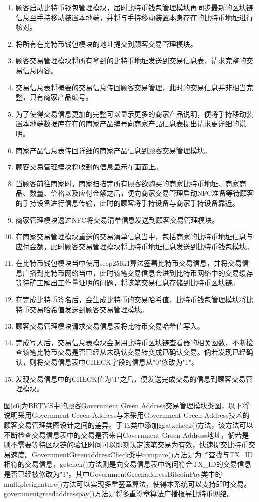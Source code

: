 	\begin{enumerate}
		\item 顾客启动比特币钱包管理模块，届时比特币钱包管理模块再同步最新的区块链信息至手持移动装置本地端，并将与手持移动装置本身存在的比特币地址进行核对。
		\item 将所有在比特币钱包模块的地址提交到顾客交易管理模块。
		\item 顾客交易管理模块将所有拿到的比特币地址发送到交易信息表，请求完整的交易信息内容。
		\item 交易信息表将概要的交易信息传回顾客交易管理，此时的交易信息并非相当完整，只有商家产品编号。
		\item 为了使得交易信息更加的完整可以显示更多的商家产品说明，便将手持移动装置本地端数据库存在的商家产品编号向商家产品信息表提出请求更详细的说明。
		\item 商家产品信息表传回详细的商家产品信息到顾客交易管理模块。
		\item 顾客交易管理模块将收到的信息显示在画面上。
		\item 当顾客前往商家时，商家扫描完所有顾客欲购买的商家比特币地址、商家商品、数量、价格以及应付金额之后，便向商家交易管理启动NFC准备等待顾客的手持设备进行信息传输，此时的顾客将手持设备与商家手持设备靠近。
		\item 商家管理模块透过NFC将交易清单信息发送到顾客交易管理模块。
		\item 在商家交易管理模块重送的交易清单信息当中，包括商家的比特币地址信息与应付金额，此时顾客交易管理模块将比特币地址信息发送到比特币钱包模块。
		\item 在比特币钱包模块当中使用secp256k1算法签署比特币交易信息，并将交易信息广播到比特币网络当中，此时该笔交易信息会进到⽐特币网络中的交易缓存等待矿工解出工作量证明的问题，将该笔交易信息存储到比特币区块链。
		\item 在完成比特币签名后，会生成比特币的交易哈希值，比特币钱包管理模块将比特币交易哈希值发送到顾客交易管理模块。
		\item 顾客交易管理模块请求交易信息表将比特币交易哈希值写入。
		\item 完成写入后，交易信息表模块会调用比特币区块链查看器的相关函数，不断检查该笔比特币交易是否已经从未确认交易转变成已确认交易。倘若发现已经确认，则将交易信息表中CHECK字段的信息从"0"修改为"1"。
		\item 发现交易信息中的CHECK值为"1"之后，便发送完成交易的信息到顾客交易管理模块。
	\end{enumerate}

	图\ref{c6}为BRTMS中的顾客Government Green Address交易管理模块类图，以下将说明采用Government Green Address与未采用Government Green Address技术的顾客交易管理类图设计之间的差异。于Tx类中添加ggatxcheck()方法，该方法可以不断检查交易信息表中的交易是否来自Government Green Address地址，倘若是则不需要等待区块链的验证时间可以即刻认定该笔交易为有效，快速提交比特币交易速度。GovernmentGreenaddressCheck类中compare()方法是为了查找与TX\_ID相符的交易信息，getchek()方法则是向交易信息表中询问符合TX\_ID的交易信息是否已经被修改为"1"。其中GovernmentGreenaddressBitcoinPay类中的multiplesignature()方法可以实现多重签章算法，使得本系统可以支持即时交易。governmentgreedaddresspay()方法是将多重签章算法广播报导比特币网络。


